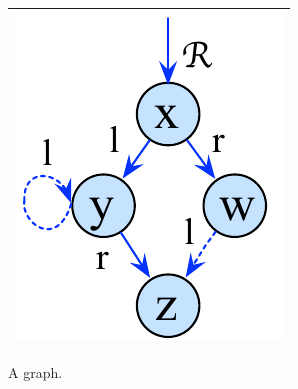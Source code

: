 \begin{figure}
	\centering
	\begin{tabular}{|c |}
		\hline
			\includegraphics[scale=0.27]{Sections/Examples/Images/graph.pdf} \\
		\hline
	\end{tabular}
\caption{A graph.}
\label{fig:graphAndTree}
\end{figure}

